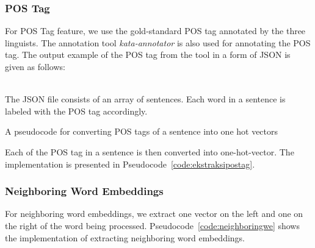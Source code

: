 \subsubsection{POS Tag}
For POS Tag feature, we use the gold-standard POS tag annotated by the three linguists. The annotation tool \textit{kata-annotator} is also used for annotating the POS tag. The output example of the POS tag from the tool in a form of JSON is given as follows:

\\

The JSON file consists of an array of sentences. Each word in a sentence is labeled with the POS tag accordingly.

\begin{kode}
	
	
	\caption{A pseudocode for converting POS tags of a sentence into one hot vectors}
	\label{code:ekstraksipostag}
\end{kode}

Each of the POS tag in a sentence is then converted into one-hot-vector. The implementation is presented in Pseudocode~\ref{code:ekstraksipostag}.

\subsubsection{Neighboring Word Embeddings}
For neighboring word embeddings, we extract one vector on the left and one on the right of the word being processed. Pseudocode~\ref{code:neighboringwe} shows the implementation of extracting neighboring word embeddings.

